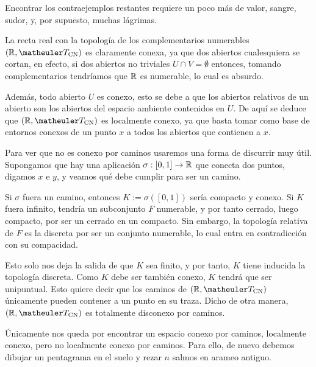 Encontrar los contraejemplos restantes requiere un poco más de valor, sangre, sudor, y, por supuesto, muchas lágrimas.
\begin{exa}
	La recta real con la topología de los complementarios numerables $(\R,\T_{\text{CN}})$ es claramente conexa, ya que dos abiertos cualesquiera se cortan, en efecto, si dos abiertos no triviales $U\cap V=\emptyset$ entonces, tomando complementarios tendríamos que $\mathbb{R}$ es numerable, lo cual es absurdo.
	
	Además, todo abierto $U$ es conexo, esto se debe a que los abiertos relativos de un abierto son los abiertos del espacio ambiente contenidos en $U$. De aquí se deduce que $(\R,\T_{\text{CN}})$ es localmente conexo, ya que basta tomar como base de entornos conexos de un punto $x$ a todos los abiertos que contienen a $x$.
	
	Para ver que no es conexo por caminos usaremos una forma de discurrir muy útil. Supongamos que hay una aplicación $\sigma:[0,1]\to\mathbb{R}$ que conecta dos puntos, digamos $x$ e $y$, y veamos qué debe cumplir para ser un camino.
	
	Si $\sigma$ fuera un camino, entonces $K:=\sigma([0,1])$ sería compacto y conexo. Si $K$ fuera infinito, tendría un subconjunto $F$ numerable, y por tanto cerrado, luego compacto, por ser un cerrado en un compacto. Sin embargo, la topología relativa de $F$ es la discreta por ser un conjunto numerable, lo cual entra en contradicción con su compacidad.
	
	Esto solo nos deja la salida de que $K$ sea finito, y por tanto, $K$ tiene inducida la topología discreta. Como $K$ debe ser también conexo, $K$ tendrá que ser unipuntual. Esto quiere decir que los caminos de $(\R,\T_{\text{CN}})$ únicamente pueden contener a un punto en su traza. Dicho de otra manera, $(\R,\T_{\text{CN}})$ es totalmente disconexo por caminos.
\end{exa}
Únicamente nos queda por encontrar un espacio conexo por caminos, localmente conexo, pero no localmente conexo por caminos. Para ello, de nuevo debemos dibujar un pentagrama en el suelo y rezar $n$ salmos en arameo antiguo.

